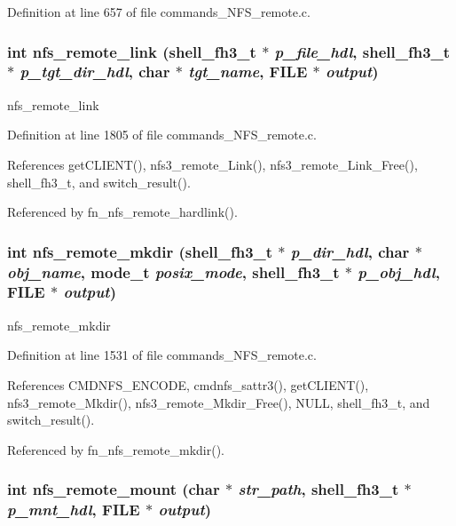 Definition at line 657 of file commands\_\-NFS\_\-remote.c.
\subsubsection{\setlength{\rightskip}{0pt plus 5cm}int nfs\_\-remote\_\-link ({\bf shell\_\-fh3\_\-t} $\ast$ {\em p\_\-file\_\-hdl}, {\bf shell\_\-fh3\_\-t} $\ast$ {\em p\_\-tgt\_\-dir\_\-hdl}, char $\ast$ {\em tgt\_\-name}, FILE $\ast$ {\em output})}\label{commands__NFS__remote_8c_a54}


nfs\_\-remote\_\-link 

Definition at line 1805 of file commands\_\-NFS\_\-remote.c.

References get\-CLIENT(), nfs3\_\-remote\_\-Link(), nfs3\_\-remote\_\-Link\_\-Free(), shell\_\-fh3\_\-t, and switch\_\-result().

Referenced by fn\_\-nfs\_\-remote\_\-hardlink().
\subsubsection{\setlength{\rightskip}{0pt plus 5cm}int nfs\_\-remote\_\-mkdir ({\bf shell\_\-fh3\_\-t} $\ast$ {\em p\_\-dir\_\-hdl}, char $\ast$ {\em obj\_\-name}, mode\_\-t {\em posix\_\-mode}, {\bf shell\_\-fh3\_\-t} $\ast$ {\em p\_\-obj\_\-hdl}, FILE $\ast$ {\em output})}\label{commands__NFS__remote_8c_a49}


nfs\_\-remote\_\-mkdir 

Definition at line 1531 of file commands\_\-NFS\_\-remote.c.

References CMDNFS\_\-ENCODE, cmdnfs\_\-sattr3(), get\-CLIENT(), nfs3\_\-remote\_\-Mkdir(), nfs3\_\-remote\_\-Mkdir\_\-Free(), NULL, shell\_\-fh3\_\-t, and switch\_\-result().

Referenced by fn\_\-nfs\_\-remote\_\-mkdir().
\subsubsection{\setlength{\rightskip}{0pt plus 5cm}int nfs\_\-remote\_\-mount (char $\ast$ {\em str\_\-path}, {\bf shell\_\-fh3\_\-t} $\ast$ {\em p\_\-mnt\_\-hdl}, FILE $\ast$ {\em output})}\label{commands__NFS__remote_8c_a56}


